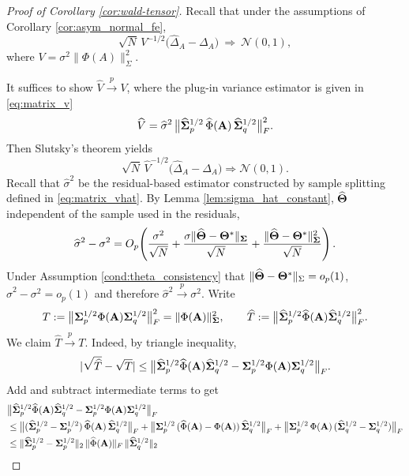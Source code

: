 \documentclass[authoryear,preprint,review,12pt]{elsarticle}
\begin{document}
\begin{proof}[Proof of Corollary \ref{cor:wald-tensor}]
	Recall that under the assumptions of Corollary \ref{cor:asym_normal_fe},
	\[
	\sqrt{N}\,V^{-1/2}\bigl(\widehat\Delta_A-\Delta_A\bigr)\ \Rightarrow\ \mathcal{N}(0,1),
	\]
	where \(V=\sigma^2\|\Phi(A)\|_{\Sigma}^2\).
	
	It suffices to show \(\widehat V \stackrel{p}{\rightarrow} V\), where the plug-in variance estimator is given in \eqref{eq:matrix_v}
	\[
	\widehat V
	= \widehat\sigma^2\,
	\bigl\|\widehat{\mathbf{ \Sigma}}_p^{1/2}\,\widehat\Phi(\mathbf{A})\,\widehat{\mathbf{ \Sigma}}_q^{1/2}\bigr\|_F^2.
	\]
	Then Slutsky's theorem yields
	\[
	\sqrt{N}\,\widehat V^{-1/2}\bigl(\widehat\Delta_A-\Delta_A\bigr) 
	\Rightarrow \mathcal{N}(0,1).
	\]
	Recall that \(\widehat\sigma^2\) be the residual-based estimator constructed by sample splitting defined in \eqref{eq:matrix_vhat}.  
	By Lemma \ref{lem:sigma_hat_constant}, 
	\(\widehat{\mathbf{\Theta}}\) independent of the sample used in the residuals,
	\[
	\widehat\sigma^2-\sigma^2
	= O_p\!\left(
	\frac{\sigma^2}{\sqrt{N}}
	+\frac{\sigma\|\widehat{\mathbf{\Theta}}-\mathbf{\Theta}^*\|_{\mathbf{ \Sigma}}}{\sqrt{N}}
	+\frac{\|\widehat{\mathbf{\Theta}}-\mathbf{\Theta}^*\|_{\mathbf{ \Sigma}}^2}{\sqrt{N}}
	\right).
	\]
	Under Assumption \ref{cond:theta_consistency} that \(\|\widehat{\mathbf{\Theta}}-\mathbf{\Theta}^*\|_\Sigma=o_p(1)\),  
	\(\widehat\sigma^2-\sigma^2=o_p(1)\) and therefore \(\widehat\sigma^2 \stackrel{p}{\rightarrow}\sigma^2\). 
	Write
	\[
	T := \bigl\|\mathbf{ \Sigma}_p^{1/2}\Phi(\mathbf{A})\mathbf{ \Sigma}_q^{1/2}\bigr\|_F^2=\|\Phi(\mathbf{A})\|_{\mathbf{ \Sigma}}^2,
	\qquad
	\widehat T := \bigl\|\widehat{\mathbf{ \Sigma}}_p^{1/2}\widehat\Phi(\mathbf{A})\widehat{\mathbf{ \Sigma}}_q^{1/2}\bigr\|_F^2.
	\]
	We claim \(\widehat T \stackrel{p}{\rightarrow} T\).
	Indeed, by triangle inequality,
	\[
	|\sqrt{\widehat T}-\sqrt{T} |
	\le
	\bigl\|\widehat{\mathbf{ \Sigma}}_p^{1/2}\widehat\Phi(\mathbf{A})\widehat{\mathbf{ \Sigma}}_q^{1/2}  - \mathbf{ \Sigma}_p^{1/2}\Phi(\mathbf{A})\mathbf{ \Sigma}_q^{1/2}  \bigr\|_F .
	\]
	Add and subtract intermediate terms to get
	\begin{align*}
		&\bigl\| \widehat{\bSigma}_p^{1/2}\widehat\Phi(\bA)\widehat{\bSigma}_q^{1/2}
		- \bSigma_p^{1/2}\Phi(\bA)\bSigma_q^{1/2}\bigr\|_F \\
		&\le
		\bigl\| (\widehat{\bSigma}_p^{1/2}-\bSigma_p^{1/2})\,\widehat\Phi(\bA)\,\widehat{\bSigma}_q^{1/2}\bigr\|_F
		+\bigl\|\bSigma_p^{1/2}\,(\widehat\Phi(\bA)-\Phi(\bA))\,\widehat{\bSigma}_q^{1/2}\bigr\|_F
		+\bigl\|\bSigma_p^{1/2}\,\Phi(\bA)\,(\widehat{\bSigma}_q^{1/2}-\bSigma_q^{1/2})\bigr\|_F \\
		&\le
		\|\widehat{\bSigma}_p^{1/2}-\bSigma_p^{1/2}\|_2\,
		\|\widehat\Phi(\bA)\|_F\,\|\widehat{\bSigma}_q^{1/2}\|_2

\end{align*}
\end{proof}
\end{document}
